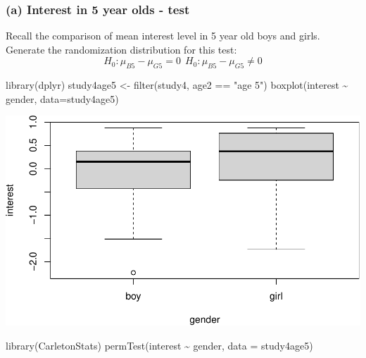 \documentclass[
]{book}
\newenvironment{Shaded}{\begin{snugshade}}{\end{snugshade}}
\newcommand{\AttributeTok}[1]{\textcolor[rgb]{0.77,0.63,0.00}{#1}}
\newcommand{\FunctionTok}[1]{\textcolor[rgb]{0.00,0.00,0.00}{#1}}
\newcommand{\NormalTok}[1]{#1}
\newcommand{\OtherTok}[1]{\textcolor[rgb]{0.56,0.35,0.01}{#1}}
\newcommand{\SpecialCharTok}[1]{\textcolor[rgb]{0.00,0.00,0.00}{#1}}
\newcommand{\StringTok}[1]{\textcolor[rgb]{0.31,0.60,0.02}{#1}}
\begin{document}
\hypertarget{a-interest-in-5-year-olds---test}{%
\subsubsection{(a) Interest in 5 year olds - test}\label{a-interest-in-5-year-olds---test}}

Recall the comparison of mean interest level in 5 year old boys and girls. Generate the randomization distribution for this test:
\[
H_0: \mu_{B5} - \mu_{G5} = 0 \ \ H_0: \mu_{B5} - \mu_{G5} \neq 0
\]

\begin{Shaded}
\begin{Highlighting}[]
\FunctionTok{library}\NormalTok{(dplyr)}
\NormalTok{study4age5 }\OtherTok{\textless{}{-}} \FunctionTok{filter}\NormalTok{(study4, age2 }\SpecialCharTok{==} \StringTok{"age 5"}\NormalTok{)}
\FunctionTok{boxplot}\NormalTok{(interest }\SpecialCharTok{\textasciitilde{}}\NormalTok{ gender, }\AttributeTok{data=}\NormalTok{study4age5)}
\end{Highlighting}
\end{Shaded}

\includegraphics[width=1\linewidth]{Class_Activity_14_files/figure-latex/unnamed-chunk-2-1}

\begin{Shaded}
\begin{Highlighting}[]
\FunctionTok{library}\NormalTok{(CarletonStats)}
\FunctionTok{permTest}\NormalTok{(interest }\SpecialCharTok{\textasciitilde{}}\NormalTok{ gender, }\AttributeTok{data =}\NormalTok{ study4age5)}
\end{Highlighting}
\end{Shaded}
\end{document}
